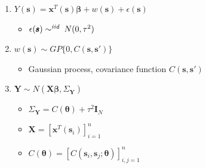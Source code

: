 \documentclass{article}
\begin{document}
\begin{enumerate}
\item $Y(\pmb{s}) = \pmb{x}^{T}(\pmb{s})\pmb{\beta} + w(\pmb{s}) + \epsilon(\pmb{s})$
    \begin{itemize}
    \item $\epsilon(\pmb{s}) \sim^{\text{{\it iid} }} N(0, \tau^{2})$
    \end{itemize}
\item $w(\pmb{s}) \sim GP\{0, C(\pmb{s}, \pmb{s}')\}$
      \begin{itemize}
      \item Gaussian process, covariance function $C(\pmb{s}, \pmb{s}')$
      \end{itemize}
\item $\pmb{Y} \sim N(\pmb{X\beta}, \Sigma_{\pmb{Y}})$
      \begin{itemize}
      \item $\Sigma_{\pmb{Y}} = C(\pmb{\theta}) + \tau^{2}\pmb{I}_{N}$
      \item $\pmb{X} = [\pmb{x}^{T}(\pmb{s}_{i})]_{i=1}^{n}$
      \item $C(\pmb{\theta}) = [C(\pmb{s}_{i}, \pmb{s}_{j}; \pmb{\theta})]_{i,j=1}^{n}$
      \end{itemize}


\end{enumerate}
\end{document}
